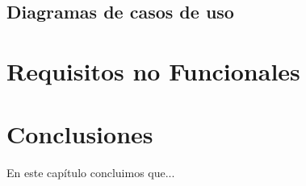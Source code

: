 
\subsection{Diagramas de casos de uso}









\section{Requisitos no Funcionales}


\section{Conclusiones}

En este capítulo concluimos que...
